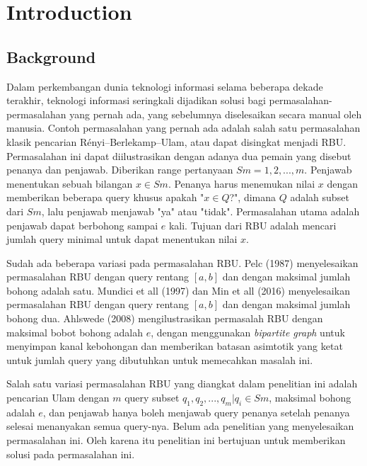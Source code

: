\documentclass[conference,compsoc]{IEEEtran}
\begin{document}


%
\IEEEpeerreviewmaketitle


\section{Introduction}

\subsection{Background}

Dalam perkembangan dunia teknologi informasi selama beberapa dekade terakhir, teknologi informasi seringkali dijadikan solusi bagi permasalahan-permasalahan yang pernah ada, yang sebelumnya diselesaikan secara manual oleh manusia. Contoh permasalahan yang pernah ada adalah salah satu permasalahan klasik pencarian Rényi–Berlekamp–Ulam, atau dapat disingkat menjadi RBU. Permasalahan ini dapat diilustrasikan dengan adanya dua pemain yang disebut penanya dan penjawab. Diberikan range pertanyaan $Sm = {1,2,...,m}$. Penjawab menentukan sebuah bilangan $x \in Sm$. Penanya harus menemukan nilai $x$ dengan memberikan beberapa query khusus apakah "$x \in Q$?", dimana $Q$ adalah subset dari $Sm$, lalu penjawab menjawab "ya" atau "tidak". Permasalahan utama adalah penjawab dapat berbohong sampai $e$ kali. Tujuan dari RBU adalah mencari jumlah query minimal untuk dapat menentukan nilai $x$. 

Sudah ada beberapa variasi pada permasalahan RBU. Pelc (1987) menyelesaikan permasalahan RBU dengan query rentang $[a,b]$ dan dengan maksimal jumlah bohong adalah satu. Mundici et all (1997) dan Min et all (2016) menyelesaikan permasalahan RBU dengan query rentang $[a,b]$ dan dengan maksimal jumlah bohong dua. Ahlswede (2008) mengilustrasikan permasalah RBU dengan maksimal bobot bohong adalah $e$, dengan menggunakan \textit{bipartite graph} untuk menyimpan kanal kebohongan dan memberikan batasan asimtotik yang ketat untuk jumlah query yang dibutuhkan untuk memecahkan masalah ini.

Salah satu variasi permasalahan RBU yang diangkat dalam penelitian ini adalah pencarian Ulam dengan $m$ query subset ${q_1,q_2,...,q_m} | q_i \in Sm$, maksimal bohong adalah $e$, dan penjawab hanya boleh menjawab query penanya setelah penanya selesai menanyakan semua query-nya. Belum ada penelitian yang menyelesaikan permasalahan ini. Oleh karena itu penelitian ini bertujuan untuk memberikan solusi pada permasalahan ini.
\end{document}
